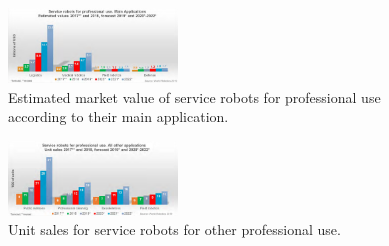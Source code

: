 \begin{appendices}
	\begin{figure}[h]
		\centering
		\includegraphics[width=0.4\textwidth]{fig/service_robots_professional_main_app_value}
		\caption{Estimated market value of service robots for professional use according to their main application.}
		\label{fig:service_robots_professional_main_app_value}
	\end{figure}
	
	\begin{figure}[h]
		\centering
		\includegraphics[width=0.4\textwidth]{fig/service_robots_professional_use_main_other_sales}
		\caption{Unit sales for service robots for other professional use.}
		\label{fig:service_robots_professional_use_main_other_sales}
	\end{figure}
	
	
\end{appendices}



